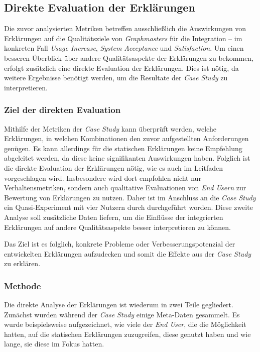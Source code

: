 \subsection{Direkte Evaluation der Erklärungen}
\label{sec:study_results_qualitativ}

Die zuvor analysierten Metriken betreffen ausschließlich die Auswirkungen von Erklärungen auf die Qualitätsziele von \textit{Graphmasters} für die Integration – im konkreten Fall \textit{Usage Increase}, \textit{System Acceptance} und \textit{Satisfaction}. Um einen besseren Überblick über andere Qualitätsaspekte der Erklärungen zu bekommen, erfolgt zusätzlich eine direkte Evaluation der Erklärungen. Dies ist nötig, da weitere Ergebnisse benötigt werden, um die Resultate der \textit{Case Study} zu interpretieren.

\subsubsection{Ziel der direkten Evaluation}

Mithilfe der Metriken der \textit{Case Study} kann überprüft werden, welche Erklärungen, in welchen Kombinationen den zuvor aufgestellten Anforderungen genügen. Es kann allerdings für die statischen Erklärungen keine Empfehlung abgeleitet werden, da diese keine signifikanten Auswirkungen haben. Folglich ist die direkte Evaluation der Erklärungen nötig, wie es auch im Leitfaden vorgeschlagen wird. Insbesondere wird dort empfohlen nicht nur Verhaltensmetriken, sondern auch qualitative Evaluationen von \textit{End Usern} zur Bewertung von Erklärungen zu nutzen. Daher ist im Anschluss an die \textit{Case Study} ein Quasi-Experiment mit vier Nutzern durch durchgeführt worden. Diese zweite Analyse soll zusätzliche Daten liefern, um die Einflüsse der integrierten Erklärungen auf andere Qualitätsaspekte besser interpretieren zu können.

Das Ziel ist es folglich, konkrete Probleme oder Verbesserungspotenzial der entwickelten Erklärungen aufzudecken und somit die Effekte aus der \textit{Case Study} zu erklären.

\subsubsection{Methode}

Die direkte Analyse der Erklärungen ist wiederum in zwei Teile gegliedert. Zunächst wurden während der \textit{Case Study} einige Meta-Daten gesammelt. Es wurde beispielsweise aufgezeichnet, wie viele der \textit{End User}, die die Möglichkeit hatten, auf die statischen Erklärungen zuzugreifen, diese genutzt haben und wie lange, sie diese im Fokus hatten.

